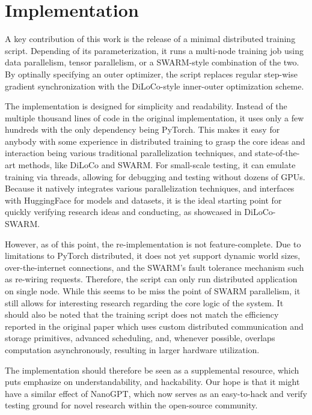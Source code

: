 \documentclass{article}
\begin{document}
\section{Implementation}

A key contribution of this work is the release of a minimal distributed training
script. Depending of its parameterization, it runs a multi-node training job
using data parallelism, tensor parallelism, or a SWARM-style combination of the
two. By optinally specifying an outer optimizer, the script replaces regular
step-wise gradient synchronization with the DiLoCo-style inner-outer
optimization scheme.

The implementation is designed for simplicity and readability. Instead of the
multiple thousand lines of code in the original implementation, it uses only a
few hundreds with the only dependency being PyTorch. This makes it easy for
anybody with some experience in distributed training to grasp the core ideas and
interaction being various traditional parallelization techniques, and 
state-of-the-art methods, like DiLoCo and SWARM. For small-scale testing, it can
emulate training via threads, allowing for debugging and testing without dozens
of GPUs. Because it natively integrates various parallelization techniques, and
interfaces with HuggingFace for models and datasets, it is the ideal starting
point for quickly verifying research ideas and conducting, as showcased in
DiLoCo-SWARM.

However, as of this point, the re-implementation is not feature-complete. Due to
limitations to PyTorch distributed, it does not yet support dynamic world sizes,
over-the-internet connections, and the SWARM's fault tolerance mechanism such as
re-wiring requests. Therefore, the script can only run distributed application
on single node. While this seems to be miss the point of SWARM parallelism, it
still allows for interesting research regarding the core logic of the system. It
should also be noted that the training script does not match the efficiency
reported in the original paper which uses custom distributed communication and
storage primitives, advanced scheduling, and, whenever possible, overlaps
computation asynchronously, resulting in larger hardware utilization.


The implementation should therefore be seen as a supplemental resource, which
puts emphasize on understandability, and hackability. Our hope is that it might
have a similar effect of NanoGPT, which now serves as an easy-to-hack and verify
testing ground for novel research within the open-source community.
\end{document}
